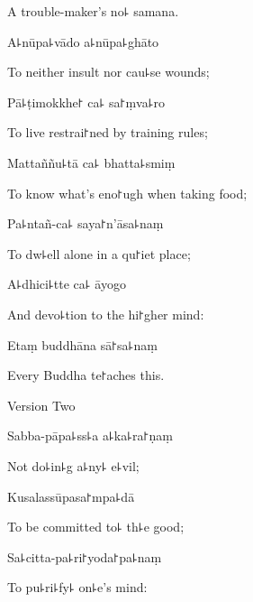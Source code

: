\begin{english}
  A trouble-maker's no꜕ samana.
\end{english}

A꜕nūpa꜕vādo a꜕nūpa꜕ghāto

\begin{english}
  To neither insult nor cau꜕se wounds;
\end{english}

Pā꜕ṭimokkhe꜓ ca꜕ sa꜓ṃva꜕ro

\begin{english}
  To live restrai꜓ned by training rules;
\end{english}

Mattaññu꜕tā ca꜕ bhatta꜕smiṃ

\begin{english}
  To know what's eno꜓ugh when taking food;
\end{english}

Pa꜕ntañ-ca꜕ saya꜓n'āsa꜕naṃ

\begin{english}
  To dw꜕ell alone in a qu꜓iet place;
\end{english}

A꜕dhici꜕tte ca꜕ āyogo

\begin{english}
  And devo꜕tion to the hi꜓gher mind:
\end{english}

Etaṃ buddhāna sā꜓sa꜕naṃ

\begin{english}
  Every Buddha te꜓aches this.
\end{english}

\clearpage

\begin{instruction}
  Version Two
\end{instruction}

Sabba-pāpa꜕ss꜕a a꜕ka꜕ra꜓ṇaṃ

\begin{english}
  Not do꜕in꜕g a꜕ny꜕ e꜕vil;
\end{english}

Kusalassūpasa꜓mpa꜕dā

\begin{english}
  To be committed to꜕ th꜕e good;
\end{english}

Sa꜕citta-pa꜕ri꜓yoda꜓pa꜕naṃ

\begin{english}
  To pu꜕ri꜕fy꜕ on꜕e's mind:
\end{english}

